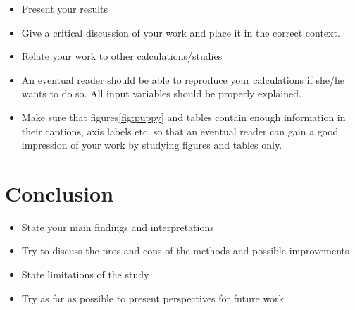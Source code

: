 \documentclass[amssymb,twocolumn,aps]{revtex4}
\begin{document}
\begin{itemize}
    \item Present your results
    \item Give a critical discussion of your work and place it in the correct context.
    \item Relate your work to other calculations/studies
    \item An eventual reader should be able to reproduce your calculations if she/he wants to do so. All input variables should be properly explained.
    \item Make sure that figures\ref{fig:puppy} and tables contain enough information in their captions, axis labels etc. so that an eventual reader can gain a good impression of your work by studying figures and tables only.
\end{itemize}



\section{Conclusion}\label{section:conclusion} 
\begin{itemize}
    \item State your main findings and interpretations
    \item Try to discuss the pros and cons of the methods and possible improvements
    \item State limitations of the study
    \item Try as far as possible to present perspectives for future work
\end{itemize}


\end{document}
